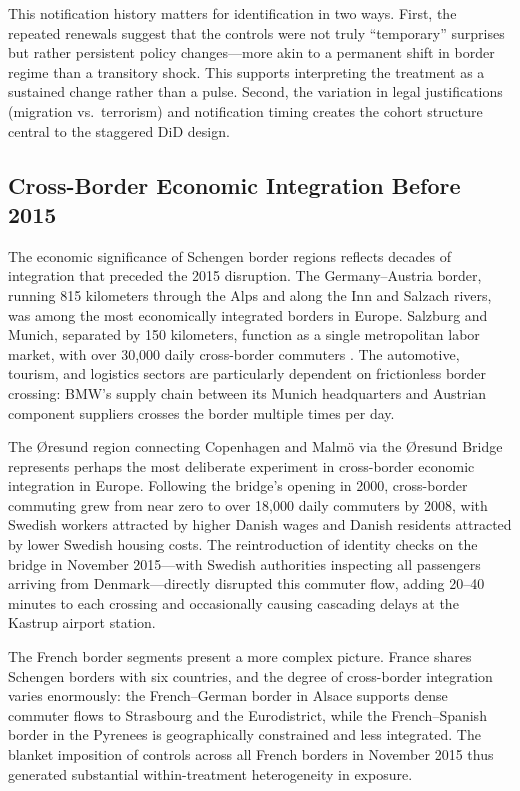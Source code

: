 \documentclass[12pt]{article}
\begin{document}
This notification history matters for identification in two ways. First, the repeated renewals suggest that the controls were not truly ``temporary'' surprises but rather persistent policy changes---more akin to a permanent shift in border regime than a transitory shock. This supports interpreting the treatment as a sustained change rather than a pulse. Second, the variation in legal justifications (migration vs.\ terrorism) and notification timing creates the cohort structure central to the staggered DiD design.

\subsection{Cross-Border Economic Integration Before 2015}

The economic significance of Schengen border regions reflects decades of integration that preceded the 2015 disruption. The Germany--Austria border, running 815 kilometers through the Alps and along the Inn and Salzach rivers, was among the most economically integrated borders in Europe. Salzburg and Munich, separated by 150 kilometers, function as a single metropolitan labor market, with over 30,000 daily cross-border commuters \citep{Brulhart2011}. The automotive, tourism, and logistics sectors are particularly dependent on frictionless border crossing: BMW's supply chain between its Munich headquarters and Austrian component suppliers crosses the border multiple times per day.

The \O resund region connecting Copenhagen and Malm\"o via the \O resund Bridge represents perhaps the most deliberate experiment in cross-border economic integration in Europe. Following the bridge's opening in 2000, cross-border commuting grew from near zero to over 18,000 daily commuters by 2008, with Swedish workers attracted by higher Danish wages and Danish residents attracted by lower Swedish housing costs. The reintroduction of identity checks on the bridge in November 2015---with Swedish authorities inspecting all passengers arriving from Denmark---directly disrupted this commuter flow, adding 20--40 minutes to each crossing and occasionally causing cascading delays at the Kastrup airport station.

The French border segments present a more complex picture. France shares Schengen borders with six countries, and the degree of cross-border integration varies enormously: the French--German border in Alsace supports dense commuter flows to Strasbourg and the Eurodistrict, while the French--Spanish border in the Pyrenees is geographically constrained and less integrated. The blanket imposition of controls across all French borders in November 2015 thus generated substantial within-treatment heterogeneity in exposure.
\end{document}
